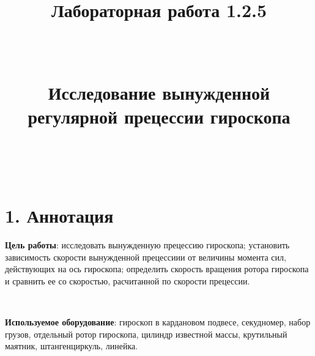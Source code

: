 \title{\textbf{Лабораторная работа 1.2.5}

\

Исследование вынужденной регулярной прецессии гироскопа

\
}
\date{}
\maketitle
\section*{1. Аннотация}
\textbf{Цель работы}: исследовать вынужденную прецессию гироскопа; установить зависимость скорости вынужденной прецессиии от величины момента сил, действующих на ось гироскопа; определить скорость вращения ротора гироскопа и сравнить ее со скоростью, расчитанной по скорости прецессии.

\

\noindent
\textbf{Используемое оборудование}: гироскоп в кардановом подвесе, секудномер, набор грузов, отдельный ротор гироскопа, цилиндр известной массы, крутильный маятник, штангенциркуль, линейка.
